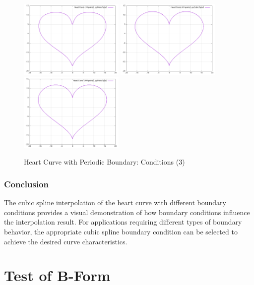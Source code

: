 \documentclass{article}
\begin{document}
\begin{figure}[H]
    \centering
    \includegraphics[width=0.45\textwidth]{../figure/pp3spline_plot_10.png}
    \includegraphics[width=0.45\textwidth]{../figure/pp3spline_plot_40.png}
    \includegraphics[width=0.45\textwidth]{../figure/pp3spline_plot_160.png}
    \caption{Heart Curve with Periodic Boundary: Conditions (3)}
    \label{fig:periodic}
\end{figure}

\subsubsection{Conclusion}
The cubic spline interpolation of the heart curve with different boundary conditions provides a visual demonstration of how boundary conditions influence the interpolation result. For applications requiring different types of boundary behavior, the appropriate cubic spline boundary condition can be selected to achieve the desired curve characteristics.


\section{Test of B-Form}
\end{document}
